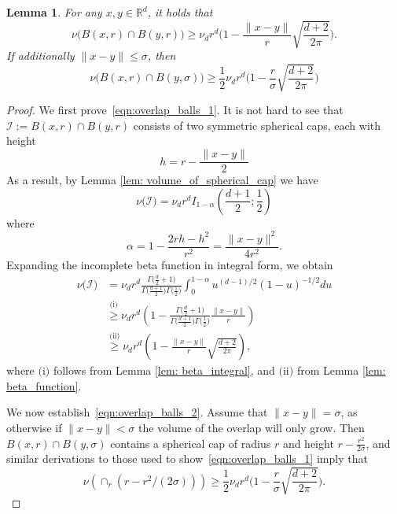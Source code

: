 \documentclass{report}
\newcommand{\Reals}{\mathbb{R}}
\newcommand{\1}{\mathbf{1}}
\newcommand{\Rd}{\Reals^d}
\theoremstyle{alden}
\theoremstyle{aldenthm}
\newtheorem{lemma}{Lemma}
\theoremstyle{definition}
\theoremstyle{remark}
\begin{document}
\begin{lemma}
	\label{lem: overlap_balls}
	For any $x,y \in \Rd$, it holds that
	\begin{equation}
	\label{eqn:overlap_balls_1}
	\nu\bigl(B(x,r) \cap B(y,r)\bigr) \geq \nu_d r^d\biggl(1 - \frac{\|x - y\|}{r} \sqrt{\frac{d + 2}{2\pi}}\biggr).
	\end{equation}
	If additionally $\|x - y\| \leq \sigma$, then
	\begin{equation}
	\label{eqn:overlap_balls_2}
	\nu\bigl(B(x,r) \cap B(y,\sigma)\bigr) \geq \frac{1}{2} \nu_d r^d\biggl(1 - \frac{r}{\sigma}\sqrt{\frac{d + 2}{2\pi}}\biggr)
	\end{equation}
\end{lemma}
\begin{proof}
	We first prove~\eqref{eqn:overlap_balls_1}. It is not hard to see that $\mathcal{I} := B(x,r) \cap B(y,r)$ consists of two symmetric spherical caps, each with height
	\begin{equation*}
	h = r - \frac{\|x - y\|}{2}
	\end{equation*} 
	As a result, by Lemma \ref{lem: volume_of_spherical_cap} we have
	\begin{equation*}
	\nu\bigl(\mathcal{I}\bigr) = \nu_d r^d I_{1 - \alpha}(\frac{d + 1}{2}; \frac{1}{2})
	\end{equation*}
	where
	\begin{equation*}
	\alpha = 1 - \frac{2rh - h^2}{r^2} = \frac{\|x - y\|^2}{4r^2}.
	\end{equation*}
	Expanding the incomplete beta function in integral form, we obtain
	\begin{align*}
	\nu\bigl(\mathcal{I}\bigr) & = \nu_d r^d \frac{\Gamma\bigl(\frac{d}{2}+ 1\bigr)}{\Gamma\bigl(\frac{d + 1}{2}\bigr) \Gamma\bigl(\frac{1}{2}\bigr)} \int_{0}^{1 - \alpha}u^{(d-1)/2}(1 - u)^{-1/2}du \\
	& \overset{\text{(i)}}{\geq} \nu_d r^d \left(1 - \frac{\Gamma\bigl(\frac{d}{2}+ 1\bigr)}{\Gamma\bigl(\frac{d + 1}{2}\bigr) \Gamma\bigl(\frac{1}{2}\bigr)} \frac{ \|x - y\|}{r} \right) \\
	& \overset{\text{(ii)}}{\geq} \nu_d r^d \left(1 - \frac{\|x - y\|}{r} \sqrt{\frac{d + 2}{2\pi}} \right),
	\end{align*}
	where $\text{(i)}$ follows from Lemma \ref{lem: beta_integral}, and $\text{(ii)}$ from Lemma \ref{lem: beta_function}.
	
	We now establish~\eqref{eqn:overlap_balls_2}. Assume that $\|x - y\| = \sigma$, as otherwise if $\|x - y\| < \sigma$ the volume of the overlap will only grow. Then $B(x,r) \cap B(y,\sigma)$ contains a spherical cap of radius $r$ and height $r - \frac{r^2}{2\sigma}$, and similar derivations to those used to show~\eqref{eqn:overlap_balls_1} imply that
	\begin{equation*}
	\nu(\cap_r(r - r^2/(2\sigma))) \geq \frac{1}{2}\nu_dr^d\biggl(1 - \frac{r}{\sigma}\sqrt{\frac{d + 2}{2\pi}}\biggr).
	\end{equation*}
\end{proof}
\end{document}
